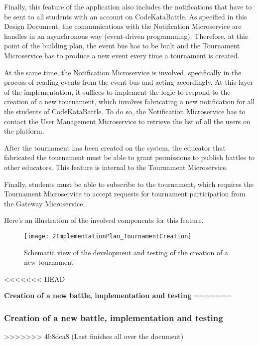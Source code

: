 Finally, this feature of the application also includes the notifications that have to be sent to all students with an account on CodeKataBattle. As specified in this Design Document, the communications with the Notification Microservice  are handles in an asynchronous way (event-driven programming). Therefore, at this point of the building plan, the event bus has to be built and the Tournament Microservice has to produce a new event every time a tournament is created. 

At the same time, the Notification Microservice is involved, specifically in the process of reading events from the event bus and acting accordingly. At this layer of the implementation, it suffices to implement the logic to respond to the creation of a new tournament, which involves fabricating a new notification for all the students of CodeKataBattle. To do so, the Notification Microservice has to contact the User Management Microservice to retrieve the list of all the users on the platform.

After the tournament has been created on the system, the educator that fabricated the tournament must be able to grant permissions to publish battles to other educators. This feature is internal to the Tournament Microservice.

Finally, students must be able to subscribe to the tournament, which requires the Tournament Microservice to accept requests for tournament participation from the Gateway Microservice.

Here's an illustration of the involved components for this feature.



\begin{figure}[h]
        \centering
	\texttt{[image: 2ImplementationPlan\_TournamentCreation]}
        \caption{Schematic view of the development and testing of the creation of a new tournament}
\end{figure}

<<<<<<< HEAD

\vspace{0.7cm}

\textbf{Creation of a new battle, implementation and testing}
=======
\newpage
\subsubsection*{Creation of a new battle, implementation and testing}
>>>>>>> 4b8dca8 (Last finishes all over the document)

